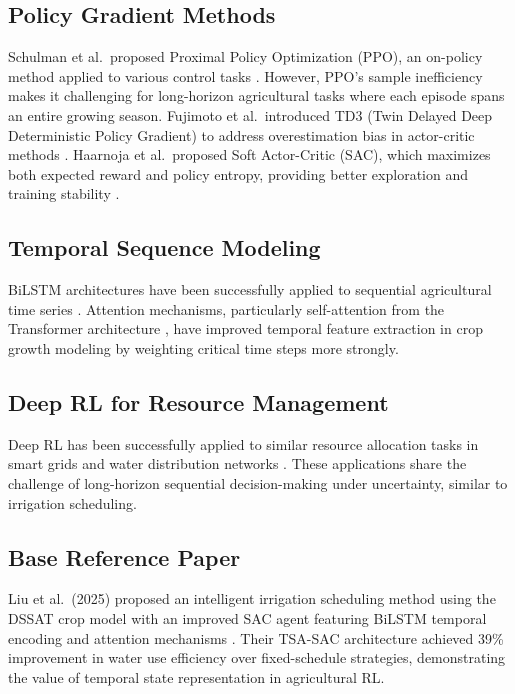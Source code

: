 \documentclass[12pt, a4paper]{article}
\begin{document}
\subsection{Policy Gradient Methods}
Schulman et al.\ proposed Proximal Policy Optimization (PPO), an on-policy method applied to various control tasks \cite{schulman2017ppo}. However, PPO's sample inefficiency makes it challenging for long-horizon agricultural tasks where each episode spans an entire growing season. Fujimoto et al.\ introduced TD3 (Twin Delayed Deep Deterministic Policy Gradient) to address overestimation bias in actor-critic methods \cite{fujimoto2018td3}. Haarnoja et al.\ proposed Soft Actor-Critic (SAC), which maximizes both expected reward and policy entropy, providing better exploration and training stability \cite{haarnoja2018sac}.

\subsection{Temporal Sequence Modeling}
BiLSTM architectures have been successfully applied to sequential agricultural time series \cite{xu2020bilstm}. Attention mechanisms, particularly self-attention from the Transformer architecture \cite{vaswani2017}, have improved temporal feature extraction in crop growth modeling by weighting critical time steps more strongly.

\subsection{Deep RL for Resource Management}
Deep RL has been successfully applied to similar resource allocation tasks in smart grids \cite{xu2020energyrl} and water distribution networks \cite{mahler2020water}. These applications share the challenge of long-horizon sequential decision-making under uncertainty, similar to irrigation scheduling.

\subsection{Base Reference Paper}
Liu et al.\ (2025) proposed an intelligent irrigation scheduling method using the DSSAT crop model with an improved SAC agent featuring BiLSTM temporal encoding and attention mechanisms \cite{liu2025}. Their TSA-SAC architecture achieved 39\% improvement in water use efficiency over fixed-schedule strategies, demonstrating the value of temporal state representation in agricultural RL.
\end{document}
